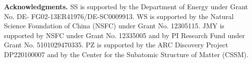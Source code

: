 \documentclass[
    twocolumn,
    superscriptaddress,
    amsmath, 
    amssymb,
    aps,
    reprint,
    floatfix
]{revtex4-2}
\newcommand{\Shufang}[1]{\textcolor{red} {SS: #1}}
\begin{document}



\vspace{0.5em}\noindent
\textbf{Acknowledgments.}
SS is supported by the Department of Energy under Grant No. DE-
FG02-13ER41976/DE-SC0009913. 
WS is supported  by the Natural Science Foundation of China (NSFC) under Grant No. 12305115. 
JMY is supported by NSFC under Grant No. 12335005 and by PI Research Fund under Grant No. 5101029470335. 
PZ is supported by the ARC Discovery Project DP220100007 and by the Center for the Subatomic Structure of Matter (CSSM).



% 
% 
\end{document}
